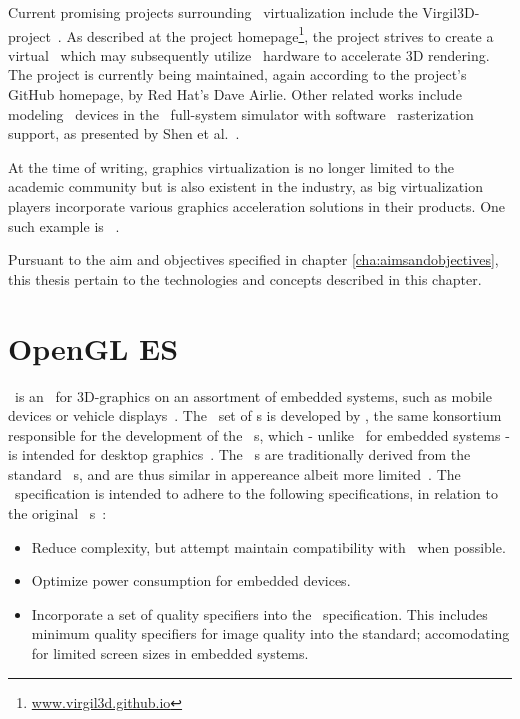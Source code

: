 Current promising projects surrounding \dvttermgpu\ virtualization include the Virgil3D-project~.
As described at the project homepage\footnote{\href{http://virgil3d.github.io/}{www.virgil3d.github.io}}, the project strives to create a virtual \dvttermgpu\ which may subsequently utilize \dvttermhost\ hardware to accelerate 3D rendering.
The project is currently being maintained, again according to the project's GitHub homepage, by Red Hat's Dave Airlie.
Other related works include modeling \dvttermgpu\ devices in the \dvttermqemu\ full-system simulator with software \dvttermopengles\ rasterization support, as presented by Shen et al.~.

At the time of writing, graphics virtualization is no longer limited to the academic community but is also existent in the industry, as big virtualization players incorporate various graphics acceleration solutions in their products.
One such example is \dvttermvmware ~.

Pursuant to the aim and objectives specified in chapter \ref{cha:aimsandobjectives}, this thesis pertain to the technologies and concepts described in this chapter.

\section{OpenGL ES}
\label{sec:backgroundandrelatedwork_opengles}
\dvttermopengles\ is an \dvttermapi\ for 3D-graphics on an assortment of embedded systems, such as mobile devices or vehicle displays~.
The \dvttermopengles\ set of \dvttermapi s is developed by \dvttermkhronos , the same konsortium responsible for the development of the \dvttermopengl\ \dvttermapi s, which - unlike \dvttermopengl\ for embedded systems - is intended for desktop graphics~.
The \dvttermopengles\ \dvttermapi s are traditionally derived from the standard \dvttermopengl\ \dvttermapi s, and are thus similar in appereance albeit more limited~.
The \dvttermopengles\ specification is intended to adhere to the following specifications, in relation to the original \dvttermopengl\ \dvttermapi s~:
\begin{itemize}[noitemsep]
	\item Reduce complexity, but attempt maintain compatibility with \dvttermopengl\ when possible.
	\item Optimize power consumption for embedded devices.
	\item Incorporate a set of quality specifiers into the \dvttermopengles\ specification. This includes minimum quality specifiers for image quality into the standard; accomodating for limited screen sizes in embedded systems.
\end{itemize}

